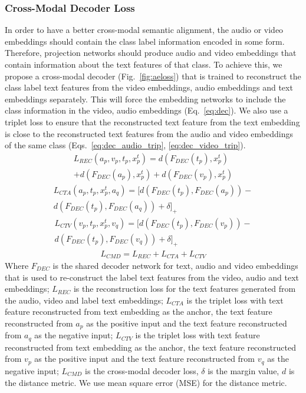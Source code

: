 \documentclass[10pt,twocolumn,letterpaper]{article}
\begin{document}
\subsubsection{Cross-Modal Decoder Loss} \label{sec:cmd}
In order to have a better cross-modal semantic alignment, the audio or video embeddings should contain the class label information encoded in some form. Therefore, projection networks should produce audio and video embeddings that contain information about the text features of that class. To achieve this, we propose a cross-modal decoder (Fig.~\ref{fig:aeloss}) that is trained to reconstruct the class label text features from the video embeddings, audio embeddings and text embeddings separately. This will force the embedding networks to include the class information in the video, audio embeddings (Eq.~\ref{eq:dec}). We also use a triplet loss to ensure that the reconstructed text feature from the text embedding is close to the reconstructed text features from the audio and video embeddings of the same class (Eqs.~\ref{eq:dec_audio_trip}, \ref{eq:dec_video_trip}).
\begin{multline}\label{eq:dec}
       L_{REC}(a_p,v_p,t_p,x^t_p)= d(F_{DEC}(t_p),x^t_p)  \\+ d(F_{DEC}(a_p),x^t_p)   + d(F_{DEC}(v_p),x^t_p) 
\end{multline}
\begin{multline}\label{eq:dec_audio_trip}
       L_{CTA}(a_p,t_p,x^t_p,a_q)= [d(F_{DEC}(t_p),F_{DEC}(a_p))-\\d(F_{DEC}(t_p),F_{DEC}(a_q))+\delta]_{+}  
\end{multline}
\begin{multline}\label{eq:dec_video_trip}
       L_{CTV}(v_p,t_p,x^t_p,v_q)= [d(F_{DEC}(t_p),F_{DEC}(v_p))-\\d(F_{DEC}(t_p),F_{DEC}(v_q))+\delta]_{+}  
\end{multline}
\begin{multline}\label{eq:ae}
       L_{CMD} = L_{REC} + L_{CTA} + L_{CTV}
\end{multline}
Where $F_{DEC}$ is the shared decoder network for text, audio and video embeddings that is used to re-construct the label text features from the video, audio and text embeddings; $L_{REC}$ is the reconstruction loss for the text features generated from the audio, video and label text embeddings; $L_{CTA}$ is the triplet loss with text feature reconstructed from text embedding as the anchor, the text feature reconstructed from $a_p$ as the positive input and the text feature reconstructed from $a_q$ as the negative input; $L_{CTV}$ is the triplet loss with text feature reconstructed from text embedding as the anchor, the text feature reconstructed from $v_p$ as the positive input and the text feature reconstructed from $v_q$ as the negative input; $L_{CMD}$ is the cross-modal decoder loss, $\delta$ is the margin value, $d$ is the distance metric. We use mean square error (MSE) for the distance metric.
\end{document}
